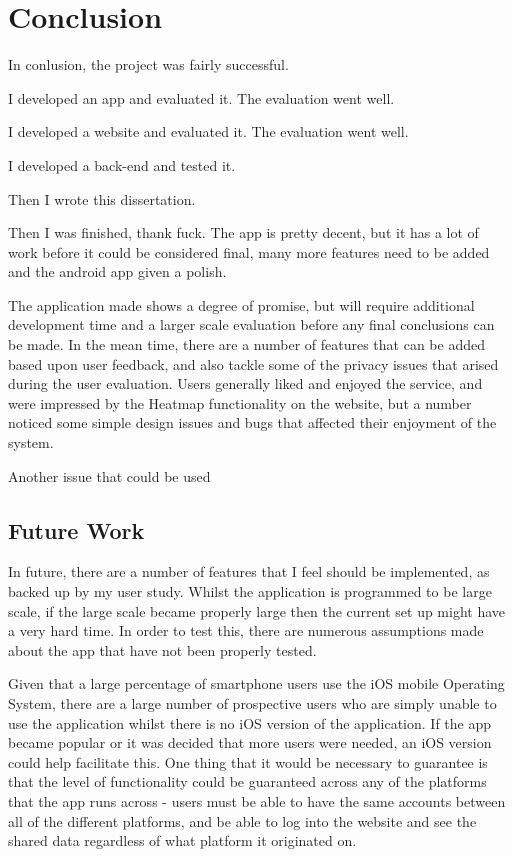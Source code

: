 \documentclass{l4proj}
\begin{document}

\chapter{Conclusion}

In conlusion, the project was fairly successful.

I developed an app and evaluated it. The evaluation went well.

I developed a website and evaluated it. The evaluation went well.

I developed a back-end and tested it.

Then I wrote this dissertation.

Then I was finished, thank fuck. The app is pretty decent, but it has a lot of work before it could be considered final, many more features need to be added and the android app given a polish.

The application made shows a degree of promise, but will require additional development time and a larger scale evaluation before any final conclusions can be made. In the mean time, there are a number of features that can be added based upon user feedback, and also tackle some of the privacy issues that arised during the user evaluation. Users generally liked and enjoyed the service, and were impressed by the Heatmap functionality on the website, but a number noticed some simple design issues and bugs that affected their enjoyment of the system.

Another issue that could be used 

\section{Future Work}

In future, there are a number of features that I feel should be implemented, as backed up by my user study. Whilst the application is programmed to be large scale, if the large scale became properly large then the current set up might have a very hard time. In order to test this, there are numerous assumptions made about the app that have not been properly tested.

Given that a large percentage of smartphone users use the iOS mobile Operating System, there are a large number of prospective users who are simply unable to use the application whilst there is no iOS version of the application. If the app became popular or it was decided that more users were needed, an iOS version could help facilitate this. One thing that it would be necessary to guarantee is that the level of functionality could be guaranteed across any of the platforms that the app runs across - users must be able to have the same accounts between all of the different platforms, and be able to log into the website and see the shared data regardless of what platform it originated on.
\end{document}
